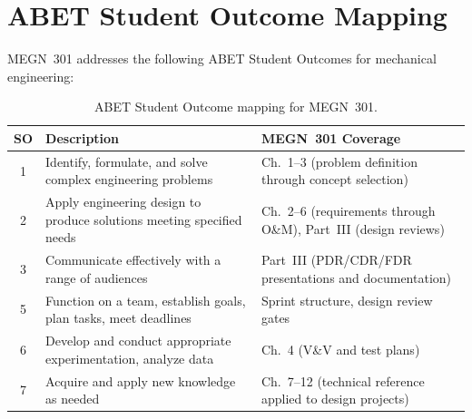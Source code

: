 \chapter*{ABET Student Outcome Mapping}

MEGN~301 addresses the following ABET Student Outcomes for mechanical engineering:

\begin{table}[htbp]\centering\small
\begin{tabularx}{\textwidth}{c X X}
\toprule
\textbf{SO} & \textbf{Description} & \textbf{MEGN~301 Coverage} \\
\midrule
1 & Identify, formulate, and solve complex engineering problems & Ch.~1--3 (problem definition through concept selection) \\
2 & Apply engineering design to produce solutions meeting specified needs & Ch.~2--6 (requirements through O\&M), Part~III (design reviews) \\
3 & Communicate effectively with a range of audiences & Part~III (PDR/CDR/FDR presentations and documentation) \\
5 & Function on a team, establish goals, plan tasks, meet deadlines & Sprint structure, design review gates \\
6 & Develop and conduct appropriate experimentation, analyze data & Ch.~4 (V\&V and test plans) \\
7 & Acquire and apply new knowledge as needed & Ch.~7--12 (technical reference applied to design projects) \\
\bottomrule
\end{tabularx}
\caption{ABET Student Outcome mapping for MEGN~301.}
\end{table}



